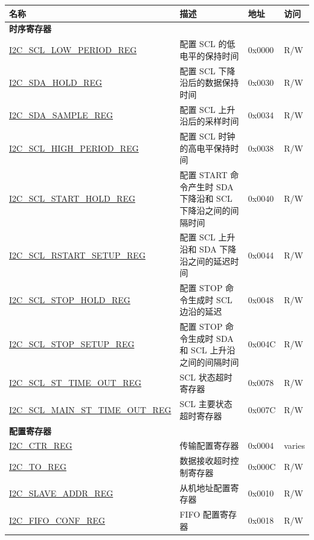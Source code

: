 \begin{longtable}{ | p{6cm} | p{7cm} | p{1.3cm} | p{1cm} | }
\hline\rowcolor{lightgray}
名称 & 描述 &  地址 & 访问 \\ \hline
\endhead
\multicolumn{4}{|l|}{\textbf{时序寄存器}} \\ \hline
\hyperref[regdesc:I2CSCLLOWPERIODREG]{I2C\_SCL\_LOW\_PERIOD\_REG} & 配置 SCL 的低电平的保持时间 & 0x0000 & R/W \\ \hline
\hyperref[regdesc:I2CSDAHOLDREG]{I2C\_SDA\_HOLD\_REG} & 配置 SCL 下降沿后的数据保持时间 & 0x0030 & R/W \\ \hline
\hyperref[regdesc:I2CSDASAMPLEREG]{I2C\_SDA\_SAMPLE\_REG} & 配置 SCL 上升沿后的采样时间 & 0x0034 & R/W \\ \hline
\hyperref[regdesc:I2CSCLHIGHPERIODREG]{I2C\_SCL\_HIGH\_PERIOD\_REG} & 配置 SCL 时钟的高电平保持时间 & 0x0038 & R/W \\ \hline
\hyperref[regdesc:I2CSCLSTARTHOLDREG]{I2C\_SCL\_START\_HOLD\_REG} & 配置 START 命令产生时 SDA 下降沿和 SCL 下降沿之间的间隔时间 & 0x0040 & R/W \\ \hline
\hyperref[regdesc:I2CSCLRSTARTSETUPREG]{I2C\_SCL\_RSTART\_SETUP\_REG} & 配置 SCL 上升沿和 SDA 下降沿之间的延迟时间 & 0x0044 & R/W \\ \hline
\hyperref[regdesc:I2CSCLSTOPHOLDREG]{I2C\_SCL\_STOP\_HOLD\_REG} & 配置 STOP 命令生成时 SCL 边沿的延迟 & 0x0048 & R/W \\ \hline
\hyperref[regdesc:I2CSCLSTOPSETUPREG]{I2C\_SCL\_STOP\_SETUP\_REG} & 配置 STOP 命令生成时 SDA 和 SCL 上升沿之间的间隔时间 & 0x004C & R/W \\ \hline
\hyperref[regdesc:I2CSCLSTTIMEOUTREG]{I2C\_SCL\_ST\_TIME\_OUT\_REG} & SCL 状态超时寄存器 & 0x0078 & R/W \\ \hline
\hyperref[regdesc:I2CSCLMAINSTTIMEOUTREG]{I2C\_SCL\_MAIN\_ST\_TIME\_OUT\_REG} & SCL 主要状态超时寄存器 & 0x007C & R/W \\ \hline
\multicolumn{4}{|l|}{\textbf{配置寄存器}} \\ \hline
\hyperref[regdesc:I2CCTRREG]{I2C\_CTR\_REG} & 传输配置寄存器 & 0x0004 & varies \\ \hline
\hyperref[regdesc:I2CTOREG]{I2C\_TO\_REG} & 数据接收超时控制寄存器 & 0x000C & R/W \\ \hline
\hyperref[regdesc:I2CSLAVEADDRREG]{I2C\_SLAVE\_ADDR\_REG} & 从机地址配置寄存器 & 0x0010 & R/W \\ \hline
\hyperref[regdesc:I2CFIFOCONFREG]{I2C\_FIFO\_CONF\_REG} & FIFO 配置寄存器 & 0x0018 & R/W \\ \hline

\end{longtable}

